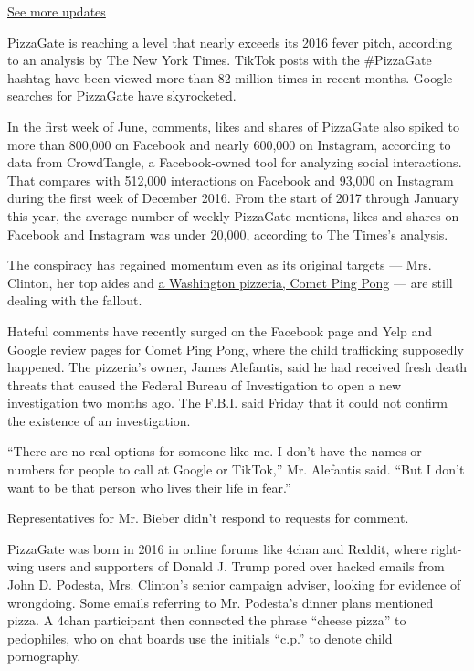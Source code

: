 \href{https://www.nytimes3xbfgragh.onion/2020/07/31/us/elections/biden-vs-trump.html?action=click\&pgtype=Article\&state=default\&region=MAIN_CONTENT_1\&context=storylines_live_updates}{See
more updates}

PizzaGate is reaching a level that nearly exceeds its 2016 fever pitch,
according to an analysis by The New York Times. TikTok posts with the
\#PizzaGate hashtag have been viewed more than 82 million times in
recent months. Google searches for PizzaGate have skyrocketed.

In the first week of June, comments, likes and shares of PizzaGate also
spiked to more than 800,000 on Facebook and nearly 600,000 on Instagram,
according to data from CrowdTangle, a Facebook-owned tool for analyzing
social interactions. That compares with 512,000 interactions on Facebook
and 93,000 on Instagram during the first week of December 2016. From the
start of 2017 through January this year, the average number of weekly
PizzaGate mentions, likes and shares on Facebook and Instagram was under
20,000, according to The Times's analysis.

The conspiracy has regained momentum even as its original targets ---
Mrs. Clinton, her top aides and
\href{https://www.nytimes3xbfgragh.onion/2016/11/21/technology/fact-check-this-pizzeria-is-not-a-child-trafficking-site.html}{a
Washington pizzeria, Comet Ping Pong} --- are still dealing with the
fallout.

Hateful comments have recently surged on the Facebook page and Yelp and
Google review pages for Comet Ping Pong, where the child trafficking
supposedly happened. The pizzeria's owner, James Alefantis, said he had
received fresh death threats that caused the Federal Bureau of
Investigation to open a new investigation two months ago. The F.B.I.
said Friday that it could not confirm the existence of an investigation.

``There are no real options for someone like me. I don't have the names
or numbers for people to call at Google or TikTok,'' Mr. Alefantis said.
``But I don't want to be that person who lives their life in fear.''

Representatives for Mr. Bieber didn't respond to requests for comment.

PizzaGate was born in 2016 in online forums like 4chan and Reddit, where
right-wing users and supporters of Donald J. Trump pored over hacked
emails from
\href{https://www.google.com/search?q=john+podesta+nytimes\&rlz=1C5GCEA_enUS903US903\&oq=john+podesta+nytimes\&aqs=chrome..69i57j33l2.2235j0j4\&sourceid=chrome\&ie=UTF-8}{John
D. Podesta}, Mrs. Clinton's senior campaign adviser, looking for
evidence of wrongdoing. Some emails referring to Mr. Podesta's dinner
plans mentioned pizza. A 4chan participant then connected the phrase
``cheese pizza'' to pedophiles, who on chat boards use the initials
``c.p.'' to denote child pornography.

